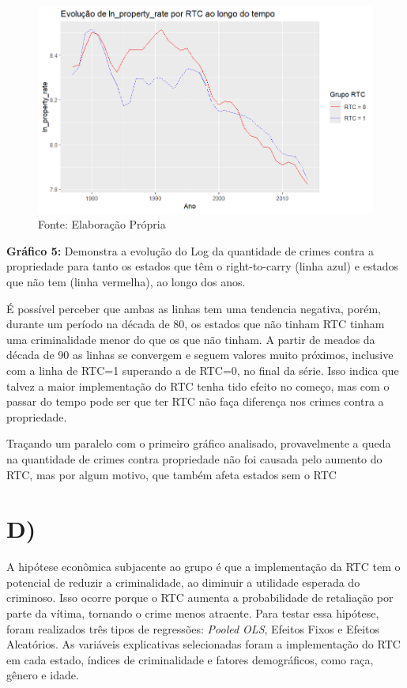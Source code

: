 \documentclass[12pt]{article}
\begin{document}
\begin{figure}[H]
    \centering
    \includegraphics[width=1\linewidth]{grafico5final.png}
    \caption{Fonte: Elaboração Própria}
    \label{fig:enter-label}
\end{figure}

\textbf{Gráfico 5:} Demonstra a evolução do Log da quantidade de crimes
contra a propriedade para tanto os estados que têm o right-to-carry
(linha azul) e estados que não tem (linha vermelha), ao longo dos anos.

É possível perceber que ambas as linhas tem uma tendencia negativa,
porém, durante um período na década de 80, os estados que não tinham RTC
tinham uma criminalidade menor do que os que não tinham. A partir de
meados da década de 90 as linhas se convergem e seguem valores muito
próximos, inclusive com a linha de RTC=1 superando a de RTC=0, no final
da série. Isso indica que talvez a maior implementação do RTC tenha tido
efeito no começo, mas com o passar do tempo pode ser que ter RTC não
faça diferença nos crimes contra a propriedade.

Traçando um paralelo com o primeiro gráfico analisado, provavelmente a
queda na quantidade de crimes contra propriedade não foi causada pelo
aumento do RTC, mas por algum motivo, que também afeta estados sem o RTC


\section*{D)}

A hipótese econômica subjacente ao grupo é que a implementação da RTC
tem o potencial de reduzir a criminalidade, ao diminuir a utilidade
esperada do criminoso. Isso ocorre porque o RTC aumenta a probabilidade
de retaliação por parte da vítima, tornando o crime menos atraente. Para
testar essa hipótese, foram realizados três tipos de regressões:
\emph{Pooled OLS}, Efeitos Fixos e Efeitos Aleatórios. As variáveis
explicativas selecionadas foram a implementação do RTC em cada estado,
índices de criminalidade e fatores demográficos, como raça, gênero e
idade.
\end{document}
